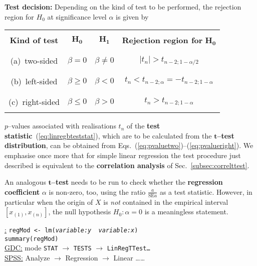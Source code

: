 \medskip
\noindent
\textbf{Test decision:} Depending on the kind of test to be 
performed, the rejection region for $H_{0}$ at significance level 
$\alpha$ is given by
%
\begin{center}
\begin{tabular}[h]{c|c|c|c}
 & & & \\
\textbf{Kind of test} & $\boldsymbol{H_{0}}$ &
$\boldsymbol{H_{1}}$ &
\textbf{Rejection region for} $\boldsymbol{H_{0}}$ \\
 & & & \\
\hline
 & & & \\
(a)~two-sided & $\beta = 0$ & $\beta \neq 0$ &
$|t_{n}|>t_{n-2;1-\alpha/2}$ \\
 & & & \\
\hline
 & & & \\
(b)~left-sided & $\beta \geq 0$ & $\beta < 0$ &
$t_{n}<t_{n-2;\alpha}=-t_{n-2;1-\alpha}$ \\
 & & & \\
\hline
 & & & \\
(c)~right-sided & $\beta \leq 0$ & $\beta > 0$ &
$t_{n}>t_{n-2;1-\alpha}$ \\
 & & &
\end{tabular}
\end{center}
%
$p$--values associated with realisations $t_{n}$ of the
\textbf{test statistic}~(\ref{eq:linregbteststat}), which are to be 
calculated from the
$\boldsymbol{t}$\textbf{--test distribution}, can be obtained from 
Eqs.~(\ref{eq:pvaluetwo})--(\ref{eq:pvalueright}). We emphasise 
once more that for simple linear regression the test procedure 
just described is equivalent to the \textbf{correlation analysis}
of Sec.~\ref{subsec:correlttest}.

\medskip
\noindent
An analogous \textbf{$\boldsymbol{t}$--test} needs to be run to
check whether the \textbf{regression coefficient} $\alpha$ is
non-zero, too, using the ratio $\displaystyle\frac{a}{\text{SE}a}$
as a test statistic. However, in particular when the origin of $X$
is \textit{not} contained in the empirical interval 
$[x_{(1)},x_{(n)}]$, the null hypothesis $H_{0}: \alpha=0$ is a 
meaningless statement.

\medskip
\noindent
\underline{\R:}
\texttt{regMod <- lm(\textit{variable:y}~\texttildelow~\textit{variable:x})} \\
\texttt{summary(regMod)} \\
\underline{GDC:} mode \texttt{STAT} $\rightarrow$ \texttt{TESTS}
$\rightarrow$ \texttt{LinRegTTest\ldots} \\
\underline{SPSS:} Analyze $\rightarrow$ Regression
$\rightarrow$ Linear \ldots\ldots

